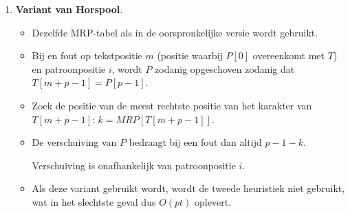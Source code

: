 \begin{itemize}
\begin{enumerate}
\begin{itemize}
        \end{itemize}
        \item \textbf{Variant van Horspool}.
        \begin{itemize}
            \item Dezelfde MRP-tabel als in de oorspronkelijke versie wordt gebruikt.
            \item Bij en fout op tekstpositie $m$ (positie waarbij $P[0]$ overeenkomt met $T$) en patroonpositie $i$, wordt $P$ zodanig opgeschoven zodanig dat $T[m + p - 1] = P[p - 1]$.
            \item Zoek de positie van de meest rechtste positie van het karakter van $T[m + p - 1]$: $k = MRP[T[m + p - 1]]$.
            \item De verschuiving van $P$ bedraagt bij een fout dan altijd $p - 1 - k$.
            \begin{itemize}
                \good Verschuiving is onafhankelijk van patroonpositie $i$.
            \end{itemize}
            \item Als deze variant gebruikt wordt, wordt de tweede heuristiek niet gebruikt, wat in het slechtste geval dus $O(pt)$ oplevert.
            \begin{table}[ht]
                \centering   
                \scalebox{0.5}{
                    
}
\end{table}
\end{itemize}
\end{enumerate}
\end{itemize}
